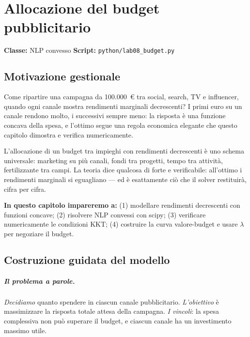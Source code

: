 \chapter{Allocazione del budget pubblicitario}
\label{cap:budget}

\noindent\textbf{Classe:} NLP convesso \hfill
\textbf{Script:} \texttt{python/lab08\_budget.py}

\section{Motivazione gestionale}

Come ripartire una campagna da 100.000~\euro{} tra social, search, TV e influencer,
quando ogni canale mostra rendimenti marginali decrescenti? I primi euro su un canale
rendono molto, i successivi sempre meno: la risposta è una funzione concava della
spesa, e l'ottimo segue una regola economica elegante che questo capitolo dimostra e
verifica numericamente.



L'allocazione di un budget tra impieghi con rendimenti decrescenti è uno schema
universale: marketing su più canali, fondi tra progetti, tempo tra attività,
fertilizzante tra campi. La teoria dice qualcosa di forte e verificabile:
all'ottimo i rendimenti marginali si eguagliano --- ed è esattamente ciò che il
solver restituirà, cifra per cifra.

\textbf{In questo capitolo impareremo a:} (1) modellare rendimenti decrescenti con
funzioni concave; (2) risolvere NLP convessi con scipy; (3) verificare
numericamente le condizioni KKT; (4) costruire la curva valore-budget e usare
$\lambda$ per negoziare il budget.

\section{Costruzione guidata del modello}

\paragraph{Il problema a parole.} \emph{Decidiamo} quanto spendere in ciascun canale
pubblicitario. \emph{L'obiettivo} è massimizzare la risposta totale attesa della
campagna. \emph{I vincoli}: la spesa complessiva non può superare il budget, e
ciascun canale ha un investimento massimo utile.

